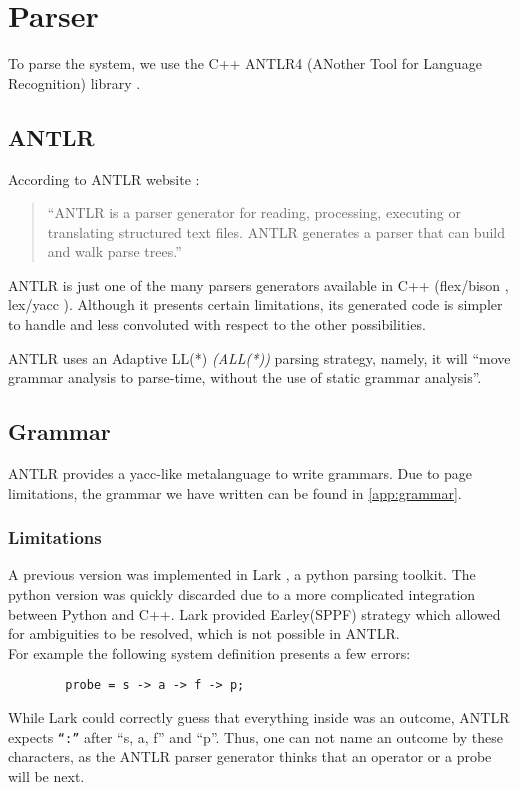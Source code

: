 \section{Parser}
        To parse the system, we use the C++ ANTLR4 (ANother Tool for Language Recognition) library \cite{antlr4}. 
        \subsection{ANTLR}
    According to ANTLR website \cite{antlr4}: 
    \begin{quote}
        ``ANTLR is a parser generator for reading, processing, executing or translating structured text files. ANTLR generates a parser that can build and walk parse trees.''
    \end{quote}

 ANTLR is just one of the many parsers generators available in C++ (flex/bison \cite{flexb}, lex/yacc \cite{lexy}). Although it presents certain limitations, its generated code is simpler to handle and less convoluted with respect to the other possibilities.

        ANTLR uses an Adaptive LL(*) \textit{(ALL(*))} parsing strategy, namely, it will ``move grammar analysis to parse-time, without the use of static grammar analysis''. \cite{antlr}

        \subsection{Grammar}
            ANTLR provides a yacc-like metalanguage \cite{antlr} to write grammars. Due to page limitations, the grammar we have written can be found in \cref{app:grammar}.
              
    \subsubsection{Limitations}
        A previous version was implemented in Lark \cite{lark}, a python parsing toolkit. The python version was quickly discarded due to a more complicated integration between Python and C++. Lark provided Earley(SPPF) strategy which allowed for ambiguities to be resolved, which is not possible in ANTLR. \\
        For example the following system definition presents a few errors:
        \begin{verbatim}
        probe = s -> a -> f -> p;
        \end{verbatim}
    While Lark could correctly guess that everything inside was an outcome, ANTLR expects \texttt{``:''} after ``s, a, f'' and ``p''. Thus, one can not name an outcome by these characters, as the ANTLR parser generator thinks that an operator or a probe will be next. 
